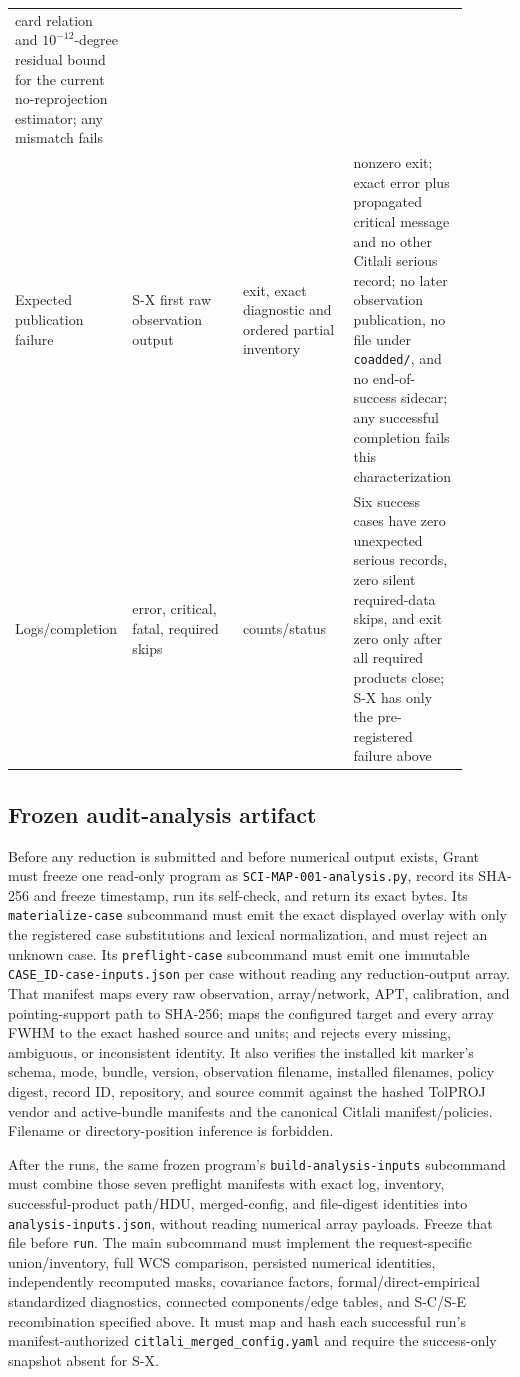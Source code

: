 \documentclass[11pt]{article}
\newcommand{\code}[1]{\nolinkurl{#1}}
\begin{document}
\begin{longtable}{L{0.17\linewidth}L{0.24\linewidth}L{0.24\linewidth}L{0.25\linewidth}}
card relation and \(10^{-12}\)-degree residual bound for the current
no-reprojection estimator; any mismatch fails\\
Expected publication failure & S-X first raw observation output & exit, exact
diagnostic and ordered partial inventory & nonzero exit; exact error plus
propagated critical message and no other Citlali serious record; no later
observation publication, no file under \code{coadded/}, and no end-of-success
sidecar; any successful completion fails this characterization\\
Logs/completion & error, critical, fatal, required skips & counts/status & Six
success cases have zero unexpected serious records, zero silent required-data
skips, and exit zero only after all required products close; S-X has only the
pre-registered failure above\\
\bottomrule
\end{longtable}

\subsection*{Frozen audit-analysis artifact}

Before any reduction is submitted and before numerical output exists, Grant
must freeze one read-only program as \code{SCI-MAP-001-analysis.py}, record its
SHA-256 and freeze timestamp, run its self-check, and return its exact bytes.
Its \code{materialize-case} subcommand must emit the exact displayed overlay
with only the registered case substitutions and lexical normalization, and
must reject an unknown case.  Its \code{preflight-case} subcommand must emit one immutable
\code{CASE_ID-case-inputs.json} per case without reading any reduction-output
array.  That manifest maps every raw observation, array/network, APT,
calibration, and pointing-support path to SHA-256; maps the configured target
and every array FWHM to the exact hashed source and units; and rejects every
missing, ambiguous, or inconsistent identity.  It also verifies the installed
kit marker's schema, mode, bundle, version, observation filename, installed
filenames, policy digest, record ID, repository, and source commit against the
hashed TolPROJ vendor and active-bundle manifests and the canonical Citlali
manifest/policies.  Filename or directory-position inference is forbidden.

After the runs, the same frozen program's \code{build-analysis-inputs}
subcommand must combine those seven preflight manifests with exact log,
inventory, successful-product path/HDU, merged-config, and file-digest
identities into \code{analysis-inputs.json}, without reading numerical array
payloads.  Freeze that file before \code{run}.  The main subcommand must
implement the request-specific union/inventory, full WCS comparison, persisted
numerical identities, independently recomputed masks, covariance factors,
formal/direct-empirical standardized diagnostics, connected components/edge
tables, and S-C/S-E recombination specified above.  It must map and hash each
successful run's manifest-authorized \code{citlali_merged_config.yaml} and
require the success-only snapshot absent for S-X.
\end{document}
